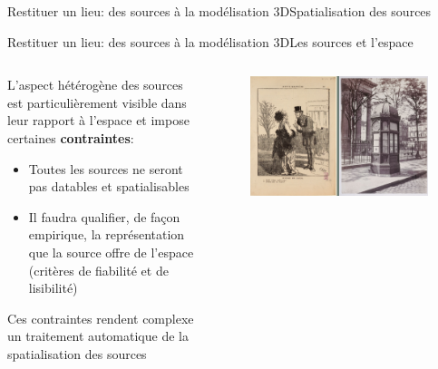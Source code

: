 \documentclass[8pt]{beamer}
\begin{document}
\begin{frame}{Restituer un lieu: des sources à la modélisation 3D}{Spatialisation des sources}
\begin{figure}
\begin{subfigure}{0.45\textwidth}
		\end{subfigure}
	\end{figure}
\end{frame}

\begin{frame}{Restituer un lieu: des sources à la modélisation 3D}{Les sources et l'espace}
	\begin{columns}[c]
		\begin{column}{0.4\textwidth}
			L’aspect hétérogène des sources est particulièrement visible dans leur rapport à l’espace et impose certaines \textbf{contraintes}:
			\begin{itemize}
				\item Toutes les sources ne seront pas datables et spatialisables
				\item Il faudra qualifier, de façon empirique, la représentation que la source offre de l’espace (critères de fiabilité et de lisibilité)
			\end{itemize}
			Ces contraintes rendent complexe un traitement automatique de la spatialisation des sources
		\end{column}
		\begin{column}{0.6\textwidth}
			\begin{figure}
				\includegraphics[width=\textwidth]{includes/c_slide5.png}
			\end{figure}	
		\end{column}
	\end{columns}
\end{frame}
\end{document}
